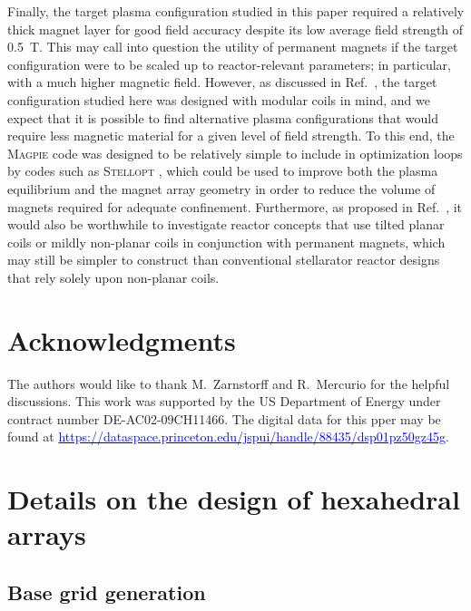 \documentclass[11pt,onecolumn]{article}
\begin{document}
Finally, the target plasma configuration studied in this paper
required a relatively thick magnet layer for good field accuracy despite its 
low average field strength of 0.5~T. This may call into question the utility
of permanent magnets if the target configuration were to be scaled up to
reactor-relevant parameters; in particular, with a much higher magnetic field.
However, as discussed in Ref.~\cite{zhu2020a}, the target configuration 
studied here was designed with modular coils in mind, and we expect that
it is possible to find alternative plasma configurations that would require
less magnetic material for a given level of field strength. 
To this end,
the \textsc{Magpie} code was designed to be relatively simple to include
in optimization loops by codes such as \textsc{Stellopt} \cite{stellopt},
which could be used to improve both the plasma equilibrium and the magnet
array geometry in order to reduce the volume of magnets required for adequate
confinement. Furthermore, as proposed in Ref.~\cite{helander2020a}, it would
also be worthwhile to investigate reactor concepts that use tilted planar 
coils or mildly non-planar coils in conjunction with permanent magnets, which
may still be simpler to construct than conventional stellarator reactor
designs that rely solely upon non-planar coils.


\section{Acknowledgments}

The authors would like to thank M.~Zarnstorff and R.~Mercurio for the helpful 
discussions.
This work was supported by the US Department of Energy under contract 
number DE-AC02-09CH11466. 
The digital data for this pper may be found at
\href{https://dataspace.princeton.edu/jspui/handle/88435/dsp01pz50gz45g}
{\textcolor{blue}
{https://dataspace.princeton.edu/jspui/handle/88435/dsp01pz50gz45g}}.

\appendix
\section{Details on the design of hexahedral arrays}
\label{app:qhex_construction}

\subsection{Base grid generation}
\label{ssect:base_grid}
\end{document}
